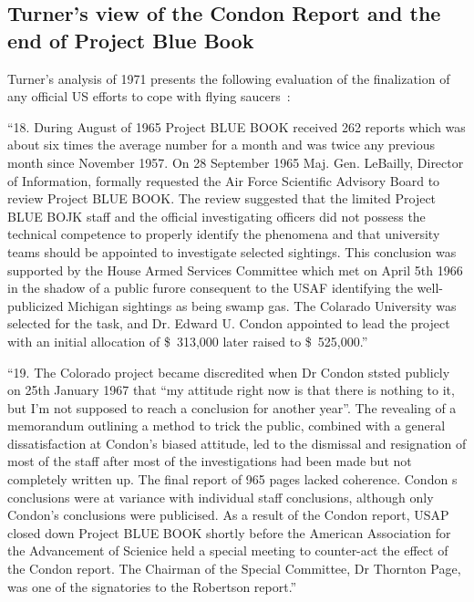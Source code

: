 \subsection{Turner's view of the Condon Report and the end of Project Blue Book}
\label{2023-UFO-part-Perception-types-USA-avecreopbb}

Turner's analysis of 1971
presents the following evaluation of the finalization of any official
US efforts to cope with flying saucers~\cite{TurnerAustralia1971}:
\begin{svgraybox}
``18. During August of 1965 Project BLUE BOOK received 262
reports which was about six times the average number for a month
and was twice any previous month since November 1957. On
28 September 1965 Maj. Gen. LeBailly, Director of Information,
formally requested the Air Force Scientific Advisory Board to
review Project BLUE BOOK. The review suggested that the limited
Project BLUE BOJK staff and the official investigating officers
did not possess the technical competence to properly identify the
phenomena and that university teams should be appointed to
investigate selected sightings. This conclusion was supported by
the House Armed Services Committee which met on April 5th 1966
in the shadow of a public furore consequent to the USAF identifying
the well-publicized Michigan sightings as being swamp gas. The
Colarado University was selected for the task, and Dr. Edward U. Condon
appointed to lead the project with an initial allocation of {\$}~313,000
later raised to {\$}~525,000.''

``19. The Colorado project became discredited when Dr Condon
ststed publicly on 25th January 1967 that ``my attitude right now
is that there is nothing to it, but I'm not supposed to reach a
conclusion for another year''. The revealing of a memorandum
outlining a method to trick the public, combined with a general
dissatisfaction at Condon's biased attitude, led to the dismissal
and resignation of most of the staff after most of the investigations
had been made but not completely written up. The final report of 965
pages lacked coherence. Condon s conclusions were at variance with
individual staff conclusions, although only Condon's conclusions were
publicised. As a result of the Condon report, USAP closed down
Project BLUE BOOK shortly before the American Association for the
Advancement of Scienice held a special meeting to counter-act the
effect of the Condon report. The Chairman of the Special Committee,
Dr Thornton Page, was one of the signatories to the Robertson report.''


\end{svgraybox}
